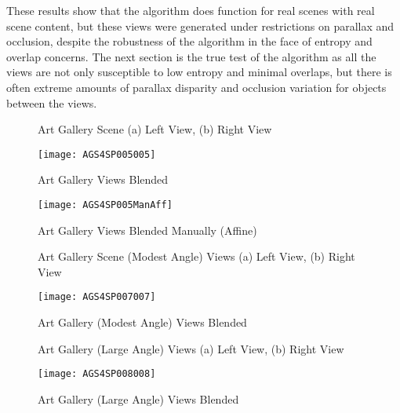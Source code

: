 These results show that the algorithm does function for real scenes with real scene content, but these views were generated under restrictions on parallax and occlusion, despite the robustness of the algorithm in the face of entropy and overlap concerns. The next section is the true test of the algorithm as all the views are not only susceptible to low entropy and minimal overlaps, but there is often extreme amounts of parallax disparity and occlusion variation for objects between the views.

\begin{figure}
\centering
{}
\caption{Art Gallery Scene (a) Left View, (b) Right View}
\label{ArtGallery4Images5}
\end{figure}

\begin{figure}
\centering
\texttt{[image: AGS4SP005005]}
\caption{Art Gallery Views Blended}
\label{ArtGallery4Stitched5}
\end{figure}

\begin{figure}
\centering
\texttt{[image: AGS4SP005ManAff]}
\caption{Art Gallery Views Blended Manually (Affine)}
\label{ArtGallery4StitchedManual5}
\end{figure}


\begin{figure}
\centering
{}
\caption{Art Gallery Scene (Modest Angle) Views (a) Left View, (b) Right View}
\label{ArtGallery4Images7}
\end{figure}

\begin{figure}
\centering
\texttt{[image: AGS4SP007007]}
\caption{Art Gallery (Modest Angle) Views Blended}
\label{ArtGallery4Stitched7}
\end{figure}


\begin{figure}
\centering
{}
\caption{Art Gallery (Large Angle) Views (a) Left View, (b) Right View}
\label{ArtGallery4Images8}
\end{figure}

\begin{figure}
\centering
\texttt{[image: AGS4SP008008]}
\caption{Art Gallery (Large Angle) Views Blended}
\label{ArtGallery4Stitched8}
\end{figure}




